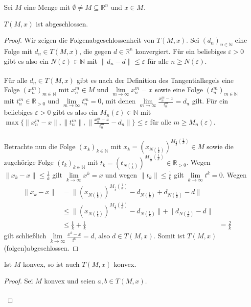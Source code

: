 
Sei $M$ eine Menge mit $\emptyset\neq M\subseteq \mathbb R^n$ und $x\in M$.

\begin{compactenum}[(i)]
\item $T(M,x)$ ist abgeschlossen.
\begin{proof}
Wir zeigen die Folgenabgeschlossenheit von $T(M,x)$. Sei $(d_n)_{n\in\mathbb N}$ eine Folge mit $d_n\in T(M,x)$, die gegen $d\in\mathbb R^n$ konvergiert. Für ein beliebiges $\varepsilon>0$ gibt es also ein $N(\varepsilon)\in\mathbb N$ mit $\|d_n-d\|\leq\varepsilon$ für alle $n\geq N(\varepsilon)$.\\\\
Für alle $d_n\in T(M,x)$ gibt es nach der Definition des Tangentialkegels eine Folge $(x_n^m)_{m\in\mathbb N}$ mit $x_n^m\in M$ und $\lim\limits_{m\to\infty} x_n^m=x$ sowie eine Folge $(t_n^m)_{m\in\mathbb N}$ mit $t_n^m\in\mathbb R_{>0}$ und $\lim\limits_{m\to\infty}t_n^m = 0$, mit denen $\lim\limits_{m\to\infty} \frac{x_n^m-x}{t_n^m}=d_n$ gilt. Für ein beliebiges $\varepsilon>0$ gibt es also ein $M_n(\varepsilon)\in\mathbb N$ mit $\max\{\|x_n^m-x\|,\|t_n^m\|,\|\frac{x_n^m-x}{t_n^m}-d_n\|\}\leq\varepsilon$ für alle $m\geq M_n(\varepsilon)$.\\\\
Betrachte nun die Folge $(x_k)_{k\in\mathbb N}$ mit $x_k=(x_{N(\frac{1}{k})})^{M_{\frac{1}{k}}(\frac{1}{k})}\in M$ sowie die zugehörige Folge $(t_k)_{k\in\mathbb N}$ mit $t_k=(t_{N(\frac{1}{k})})^{M_{\frac{1}{2k}}(\frac{1}{k})}\in\mathbb R_{>0}$. Wegen $\|x_k-x\|\leq\frac{1}{k}$ gilt $\lim\limits_{k\to\infty} x^k=x$ und wegen $\|t_k\|\leq\frac{1}{k}$ gilt $\lim\limits_{k\to\infty} t^k=0$. Wegen \begin{align*}\|x_k-x\|&=\|(x_{N(\frac{1}{k})})^{M_{\frac{1}{k}}(\frac{1}{k})}-d_{N(\frac{1}{k})}+d_{N(\frac{1}{k})}-d\|&\\&\leq\|(x_{N(\frac{1}{k})})^{M_{\frac{1}{k}}(\frac{1}{k})}-d_{N(\frac{1}{k})}\|+\|d_{N(\frac{1}{k})}-d\|&\\&\leq\frac{1}{k}+\frac{1}{k}&=\frac{2}{k}\end{align*} gilt schließlich $\lim\limits_{k\to\infty} \frac{x^k-x}{t^k}=d$, also $d\in T(M,x)$. Somit ist $T(M,x)$ (folgen)abgeschlossen.
\end{proof}\newpage
\item Ist $M$ konvex, so ist auch $T(M,x)$ konvex.
\begin{proof}
Sei $M$ konvex und seien $a,b\in T(M,x)$.\\\\

\end{proof}
\end{compactenum}
